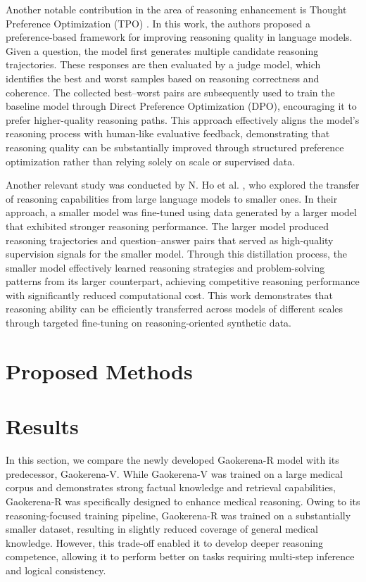 \documentclass[conference]{IEEEtran}
\begin{document}
Another notable contribution in the area of reasoning enhancement is Thought Preference Optimization (TPO)
\cite{b18}. 
In this work, the authors proposed a preference-based framework for improving reasoning quality in language models. Given a question, the model first generates multiple candidate reasoning trajectories. These responses are then evaluated by a judge model, which identifies the best and worst samples based on reasoning correctness and coherence. The collected best–worst pairs are subsequently used to train the baseline model through Direct Preference Optimization (DPO), encouraging it to prefer higher-quality reasoning paths. This approach effectively aligns the model’s reasoning process with human-like evaluative feedback, demonstrating that reasoning quality can be substantially improved through structured preference optimization rather than relying solely on scale or supervised data.

Another relevant study was conducted by N. Ho et al.
\cite{b19},
who explored the transfer of reasoning capabilities from large language models to smaller ones. In their approach, a smaller model was fine-tuned using data generated by a larger model that exhibited stronger reasoning performance. The larger model produced reasoning trajectories and question–answer pairs that served as high-quality supervision signals for the smaller model. Through this distillation process, the smaller model effectively learned reasoning strategies and problem-solving patterns from its larger counterpart, achieving competitive reasoning performance with significantly reduced computational cost. This work demonstrates that reasoning ability can be efficiently transferred across models of different scales through targeted fine-tuning on reasoning-oriented synthetic data.
          \section{Proposed Methods}
           
          \section{Results}
In this section, we compare the newly developed Gaokerena-R model with its predecessor, Gaokerena-V. While Gaokerena-V was trained on a large medical corpus and demonstrates strong factual knowledge and retrieval capabilities, Gaokerena-R was specifically designed to enhance medical reasoning. Owing to its reasoning-focused training pipeline, Gaokerena-R was trained on a substantially smaller dataset, resulting in slightly reduced coverage of general medical knowledge. However, this trade-off enabled it to develop deeper reasoning competence, allowing it to perform better on tasks requiring multi-step inference and logical consistency.  
\end{document}

